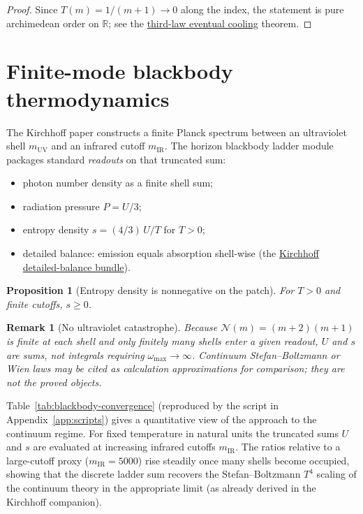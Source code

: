 \documentclass[11pt]{amsart}
\newtheorem{proposition}[theorem]{Proposition}
\newtheorem{remark}[theorem]{Remark}
\begin{document}
\begin{proof}
Since $T(m)=1/(m+1)\to 0$ along the index, the statement is pure archimedean order on
$\mathbb{R}$; see the \hyperref[lean:third-law]{third-law eventual cooling} theorem.
\end{proof}

\section{Finite-mode blackbody thermodynamics}
\label{sec:blackbody}

The Kirchhoff paper \cite{hqiv-kirchhoff-paper} constructs a finite Planck spectrum
between an ultraviolet shell $m_{\mathrm{UV}}$ and an infrared cutoff $m_{\mathrm{IR}}$.
The horizon blackbody ladder module packages standard \emph{readouts} on that truncated sum:

\begin{itemize}[leftmargin=2em]
\item photon number density as a finite shell sum;
\item radiation pressure $P=U/3$;
\item entropy density $s=(4/3)\,U/T$ for $T>0$;
\item detailed balance: emission equals absorption shell-wise
  (the \hyperref[lean:kirchhoff-balance]{Kirchhoff detailed-balance bundle}).
\end{itemize}

\begin{proposition}[Entropy density is nonnegative on the patch]
\label{prop:s-nonneg}
For $T>0$ and finite cutoffs, $s\ge 0$.
\end{proposition}

\begin{remark}[No ultraviolet catastrophe]
Because $\mathcal{N}(m)=(m+2)(m+1)$ is finite at each shell and only finitely many shells
enter a given readout, $U$ and $s$ are \emph{sums}, not integrals requiring
$\omega_{\max}\to\infty$.
Continuum Stefan--Boltzmann or Wien laws may be cited as calculation approximations for
comparison; they are not the proved objects.
\end{remark}

Table~\ref{tab:blackbody-convergence} (reproduced by the script in Appendix~\ref{app:scripts})
gives a quantitative view of the approach to the continuum regime.  For fixed temperature
in natural units the truncated sums $U$ and $s$ are evaluated at increasing infrared
cutoffs $m_{\mathrm{IR}}$.  The ratios relative to a large-cutoff proxy ($m_{\mathrm{IR}}=5000$)
rise steadily once many shells become occupied, showing that the discrete ladder sum
recovers the Stefan--Boltzmann $T^4$ scaling of the continuum theory in the appropriate
limit (as already derived in the Kirchhoff companion).
\end{document}
